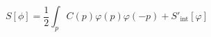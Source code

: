 \begin{equation}
S[\phi] = \frac{1}{2} \int_p C(p) \varphi (p) \varphi (-p) +
S'_{\text{int}} [\varphi]
\end{equation}

